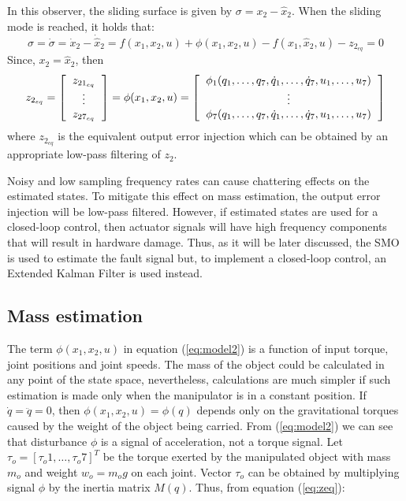 \documentclass[smallextended]{svjour3}       %
\begin{document}
In this observer, the sliding surface is given by $\sigma = x_2 - \hat{x}_2$. When the sliding mode is reached, it holds that:
\[\sigma = \dot{\sigma} = \dot{x}_2 - \dot{\hat{x}}_2 = f(x_1, x_2, u) + \phi(x_1, x_2, u) - f(x_1, \hat{x}_2, u) - z_{2_{eq}} = 0\]
Since,  $x_2 = \hat{x}_2$, then
\begin{equation}
  z_{2_{eq}} = \left[\begin{tabular}{c}
      $z_{21_{eq}}$\\
      $\vdots$\\
      $z_{27_{eq}}$
    \end{tabular}\right] = \phi(x_1, x_2, u) =
  \left[\begin{tabular}{c}
      $\phi_1(q_1,\dots, q_7, \dot{q}_1, \dots, \dot{q}_7, u_1, \dots,u_7)$\\
      $\vdots$\\
      $\phi_7(q_1,\dots, q_7, \dot{q}_1, \dots, \dot{q}_7, u_1, \dots,u_7)$
    \end{tabular}\right]
  \label{eq:zeq}
\end{equation}
where $z_{2_{eq}}$ is the equivalent output error injection which can be obtained by an appropriate low-pass filtering of $z_2$.

Noisy and low sampling frequency rates can cause chattering effects on the estimated states. To mitigate this effect on mass estimation, the output error injection will be low-pass filtered. However, if estimated states are used for a closed-loop control, then actuator signals will have high frequency components that will result in hardware damage. Thus, as it will be later discussed, the SMO is used to estimate the fault signal but, to implement a closed-loop control, an Extended Kalman Filter is used instead. 

\subsection{Mass estimation}
\label{sec:MassEstimation}
The term $\phi(x_1, x_2, u)$ in equation (\ref{eq:model2}) is a function of input torque, joint positions and joint speeds. The mass of the object could be calculated in any point of the state space, nevertheless, calculations are much simpler if such estimation is made only when the manipulator is in a constant position. If $\dot{q}= \ddot{q} = 0$, then $\phi(x_1, x_2, u) = \phi(q)$ depends only on the gravitational torques caused by the weight of the object being carried. From (\ref{eq:model2}) we can see that disturbance $\phi$ is a signal of acceleration, not a torque signal. Let $\tau_o = [\tau_o1,\dots,\tau_o7]^T$ be the torque exerted by the manipulated object with mass $m_o$ and weight $w_o=m_o g$ on each joint. Vector $\tau_o$ can be obtained by multiplying signal $\phi$ by the inertia matrix $M(q)$. Thus, from equation (\ref{eq:zeq}):
\end{document}
